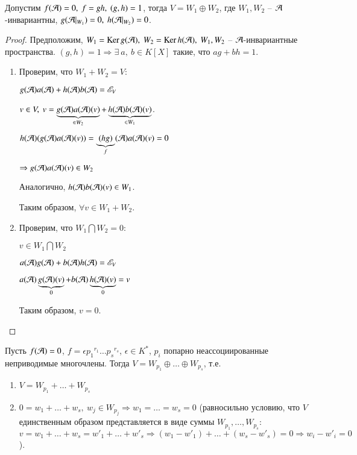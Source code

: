 \documentclass[main]{subfiles}
\begin{document}
\begin{proposition}
    Допустим $f(\mathcal{A}) = 0, \ f = gh, \ (g, h) = 1$, тогда $V = W_1 \oplus W_2$, где
    $W_1, W_2$ -- $\mathcal{A}$-инвариантны,  $g(\mathcal{A}|_{W_1}) = 0, \  h(\mathcal{A} |_{W_2}) = 0$.
\end{proposition}

\begin{proof}
    Предположим, $W_1 = \operatorname{Ker} g(\mathcal{A}), \ W_2 = \operatorname{Ker} h(\mathcal{A}), \
        W_1, W_2$ -- $\mathcal{A}$-инвариантные пространства.
    $(g, h) = 1 \Rightarrow \exists \ a, \ b \in K[X]$ такие, что $ag+bh = 1$.

    \begin{enumerate}
        \item Проверим, что $W_1 + W_2 = V$:
              \begin{center}
                  $g(\mathcal{A})a(\mathcal{A}) + h(\mathcal{A})b(\mathcal{A}) = \mathscr{E}_V$

                   $v \in V, \ v = \underbrace{g(\mathcal{A})a(\mathcal{A})(v)}_{\in W_2} + \underbrace{h(\mathcal{A})b(\mathcal{A})(v)}_{\in W_1}$.

                  $h(\mathcal{A})(g(\mathcal{A})a(\mathcal{A})(v)) = \underbrace{(hg)}_{f}(\mathcal{A})a(\mathcal{A})(v) = 0 $

                  $\Rightarrow g(\mathcal{A})a(\mathcal{A})(v) \in W_2$
              \end{center}

              Аналогично, $h(\mathcal{A})b(\mathcal{A})(v) \in W_1$.

              Таким образом, $\forall v \in W_1 + W_2$.
        \item Проверим, что $W_1 \bigcap W_2 = 0$:
              \begin{center}
                  $v \in W_1 \bigcap W_2$

                  $a(\mathcal{A})g(\mathcal{A}) + b(\mathcal{A})h(\mathcal{A}) = \mathscr{E}_V$

                  $a(\mathcal{A})\underbrace{g(\mathcal{A})(v)}_{0} + b(\mathcal{A})\underbrace{h(\mathcal{A})(v)}_{0} = v$
              \end{center}
              Таким образом, $v = 0$.
    \end{enumerate}
 \end{proof}


\begin{proposition}
    Пусть $f(\mathcal{A}) = 0$, $f = \epsilon {p_1}^{r_1} \ldots {p_s}^{r_s}$, $\epsilon \in K^*$,
    $p_i$ попарно неассоциированные неприводимые многочлены. Тогда $V = W_{p_1} \oplus \ldots \oplus W_{p_s}$, т.е.
    \begin{enumerate}
        \item $V = W_{p_1} + \ldots + W_{p_s}$
        \item $ 0 = w_1 + \ldots + w_s, \ w_j \in W_{p_j} \Rightarrow w_1 = \ldots = w_s = 0$ (равносильно условию, что $V$ единственным образом представляется в виде суммы $W_{p_1}, \ldots, W_{p_s}$: $v = w_1 + \ldots + w_s = w'_1 + \ldots + w'_s \Rightarrow (w_1 - w'_1) + \ldots + (w_s - w'_s) = 0 \Rightarrow w_i - w'_i = 0$).
    \end{enumerate}
\end{proposition}
\end{document}
